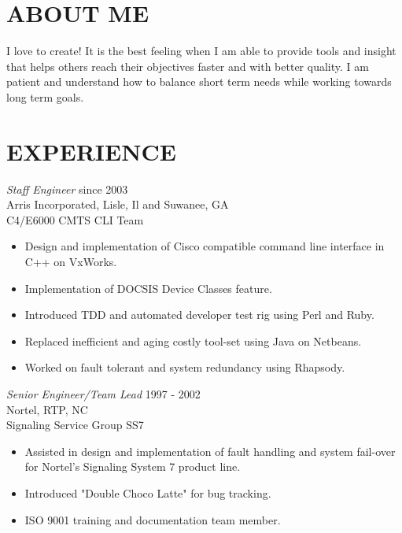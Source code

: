 \documentclass[line,margin]{res}
\begin{document}
\address{2910 Saddlebrook Glen Dr.}
\address{Cumming, GA 30041}

\begin{resume}
\section{ABOUT ME} I love to create!  It is the best feeling when I am able to provide tools and insight that helps others 
                reach their objectives faster and with better quality. I am patient and understand how to balance short
                term needs while working towards long term goals.

\section{EXPERIENCE} {\sl Staff Engineer} \hfill since 2003 \\
                Arris Incorporated, Lisle, Il and Suwanee, GA \\
                C4/E6000 CMTS CLI Team
                 \begin{itemize}  \itemsep -2pt %
                 \item Design and implementation of Cisco compatible command line interface in C++ on VxWorks.
                 \item Implementation of DOCSIS Device Classes feature.
                 \item Introduced TDD and automated developer test rig using Perl and Ruby.
                 \item Replaced inefficient and aging costly tool-set using Java on Netbeans.
                 \item Worked on fault tolerant and system redundancy using Rhapsody.
                 \end{itemize}

                {\sl Senior Engineer/Team Lead} \hfill 1997 - 2002 \\
                Nortel, RTP, NC \\
                Signaling Service Group SS7
                 \begin{itemize}  \itemsep -2pt %
                 \item Assisted in design and implementation of fault handling and system fail-over for Nortel's Signaling System 7 product line.
                 \item Introduced "Double Choco Latte" for bug tracking. 
                 \item ISO 9001 training and documentation team member.
                 \end{itemize}
                

\end{resume}
\end{document}

